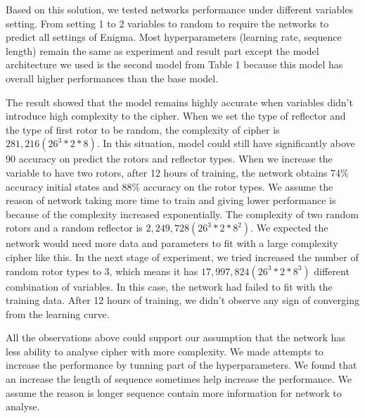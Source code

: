 Based on this solution, we tested networks performance under different variables setting. From setting 1 to 2 variables to random to require the networks to predict all settings of Enigma. Most hyperparameters (learning rate, sequence length) remain the same as experiment and result part except the model architecture we used is the second model from Table 1 because this model has overall higher performances than the base model. 

The result showed that the model remains highly accurate when variables didn’t introduce high complexity to the cipher. When we set the type of reflector and the type of first rotor to be random, the complexity of cipher is \(281,216 
 (26^3*2*8)\). In this situation, model could still have significantly above 90 accuracy on predict the rotors and reflector types. When we increase the variable to have two rotors, after 12 hours of training, the network obtains 74\% accuracy initial states and 88\% accuracy on the rotor types. We assume the reason of network taking more time to train and giving lower performance is because of the complexity increased exponentially. The complexity of two random rotors and a random reflector is \(2,249,728 (26^3*2*8^2)\). We expected the network would need more data and parameters to fit with a large complexity cipher like this. In the next stage of experiment, we tried increased the number of random rotor types to 3, which means it has \(17,997,824 (26^3*2*8^3)\) different combination of variables. In this case, the network had failed to fit with the training data. After 12 hours of training, we didn’t observe any sign of converging from the learning curve. 

All the observations above could support our assumption that the network has less ability to analyse cipher with more complexity. We made attempts to increase the performance by tunning part of the hyperparameters. We found that an increase the length of sequence sometimes help increase the performance. We assume the reason is longer sequence contain more information for network to analyse.
